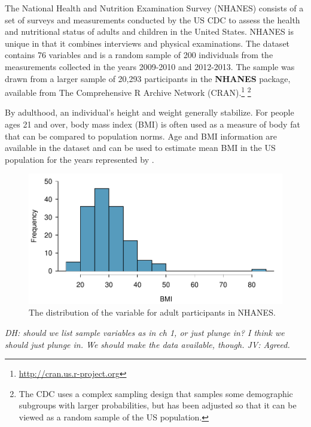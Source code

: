 \begin{spacing}{1.5}
The National Health and Nutrition Examination Survey (NHANES) consists of a set of surveys and measurements conducted by the US CDC to assess the health and nutritional status of adults and children in the United States. NHANES is unique in that it combines interviews and physical examinations.  The dataset  contains 76 variables and is a random sample of 200 individuals from the measurements collected in the years 2009-2010 and 2012-2013. The sample was drawn from a larger sample of 20,293 participants in the \textbf{NHANES} package, available from The Comprehensive R Archive Network (CRAN).\footnote{\url{http://cran.us.r-project.org}} \footnote{The CDC uses a complex sampling design that samples some demographic subgroups with larger probabilities, but  has been adjusted so that it can be viewed as a random sample of the US population.}  

By adulthood, an individual's height and weight generally stabilize. For people ages 21 and over, body mass index (BMI) is often used as a measure of body fat that can be compared to population norms. Age and BMI information are available in the dataset and can be used to estimate mean BMI in the US population for the years represented by .

\begin{figure}[h]
	\centering
	\includegraphics[width=\textwidth]
	{ch_inference_foundations_oi_biostat/figures/nhanesAdultBmiHist/nhanesAdultBmiHist}
	\caption{The distribution of the variable  for adult participants in NHANES.}
	\label{nhanesAdultBmiHist}
\end{figure}

\textit{DH: should we list sample variables as in ch 1, or just plunge in?  I think we should just plunge in.  We should make the data available, though. JV: Agreed.}


\end{spacing}
